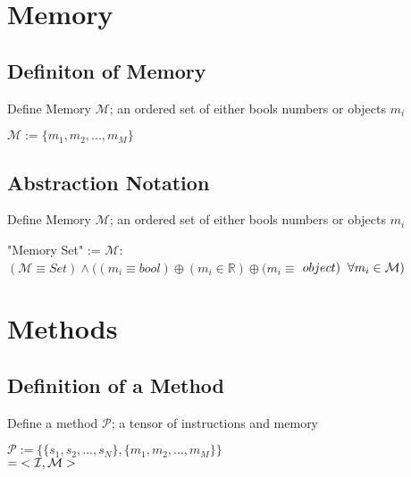 \documentclass[11pt]{article}
\begin{document}
\newpage

\section{Memory}
\subsection{Definiton of Memory}
Define Memory $\mathcal{M}$; an ordered set of either bools numbers or objects $m_i$
\begin{center}
$\mathcal{M} := \{m_1,m_2,...,m_M\}$
\end{center}




\subsection{Abstraction Notation}
Define Memory $\mathcal{M}$; an ordered set of either bools numbers or objects $m_i$
\begin{center}
"Memory Set" := $\mathcal{M}:$
\\ \vspace{2mm}
$
(\mathcal{M} \equiv Set) \land((m_i \equiv bool) \oplus (m_i \in \mathbb{R}) \oplus (m_i \equiv$ $object) \hspace{2mm} \forall m_i \in \mathcal{M})
$
\end{center}










\newpage

\section{Methods}
\subsection{Definition of a Method}
Define a method $\mathcal{P}$; a tensor of instructions and memory
\begin{center}
$
\mathcal{P} := \{ \{s_1, s_2,...,s_{N}\}, \{m_1, m_2,...,m_M\} \}
$
\\ \vspace{2mm}
$
= \hspace{1mm} < \mathcal{I}, \mathcal{M} >
$
\end{center}
\end{document}
